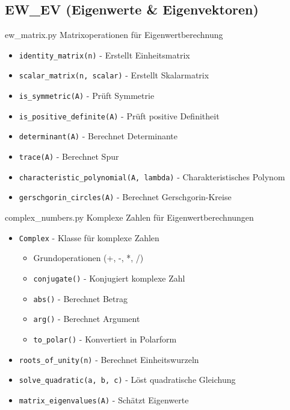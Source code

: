 \subsection{EW\_EV (Eigenwerte \& Eigenvektoren)}

\begin{KR}{ew\_matrix.py}
    Matrixoperationen für Eigenwertberechnung
    \begin{itemize}
        \item \texttt{identity\_matrix(n)} - Erstellt Einheitsmatrix
        \item \texttt{scalar\_matrix(n, scalar)} - Erstellt Skalarmatrix
        \item \texttt{is\_symmetric(A)} - Prüft Symmetrie
        \item \texttt{is\_positive\_definite(A)} - Prüft positive Definitheit
        \item \texttt{determinant(A)} - Berechnet Determinante
        \item \texttt{trace(A)} - Berechnet Spur
        \item \texttt{characteristic\_polynomial(A, lambda)} - Charakteristisches Polynom
        \item \texttt{gerschgorin\_circles(A)} - Berechnet Gerschgorin-Kreise
    \end{itemize}
\end{KR}

\begin{KR}{complex\_numbers.py}
    Komplexe Zahlen für Eigenwertberechnungen
    \begin{itemize}
        \item \texttt{Complex} - Klasse für komplexe Zahlen
            \begin{itemize}
                \item Grundoperationen (+, -, *, /)
                \item \texttt{conjugate()} - Konjugiert komplexe Zahl
                \item \texttt{abs()} - Berechnet Betrag
                \item \texttt{arg()} - Berechnet Argument
                \item \texttt{to\_polar()} - Konvertiert in Polarform
            \end{itemize}
        \item \texttt{roots\_of\_unity(n)} - Berechnet Einheitswurzeln
        \item \texttt{solve\_quadratic(a, b, c)} - Löst quadratische Gleichung
        \item \texttt{matrix\_eigenvalues(A)} - Schätzt Eigenwerte
    \end{itemize}
\end{KR}

